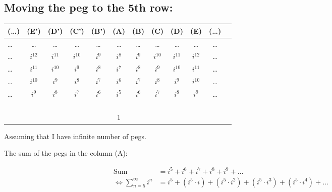 \documentclass[12pt]{article}
\begin{document}
\vspace{1cm}

\subsection*{Moving the peg to the 5th row:}
\begin{center}
    \begin{tabular}{|l|c|c|c|c|c|c|c|c|c|c|r|}
        \hline
        (\dots) & (E') & (D') & (C') & (B') & (A) & (B) & (C) & (D) & (E) & (\dots)\\
        \hline
        \dots & \dots & \dots & \dots & \dots & \dots & \dots & \dots & \dots & \dots & \dots \\
            
        \hline
        \dots & $i^{12}$ & $i^{11}$ & $i^{10}$ & $i^9$ & $i^8$ & $i^9$ & $i^{10}$ & $i^{11}$ & $i^{12}$ & \dots\\
            
        \hline
        \dots & $i^{11}$ & $i^{10}$ & $i^9$ & $i^8$ & $i^7$ & $i^8$ & $i^9$ & $i^{10}$ & $i^{11}$ & \dots\\
            
        \hline
        \dots & $i^{10}$ & $i^9$ & $i^8$ & $i^7$ & $i^6$ & $i^7$ & $i^8$ & $i^9$ & $i^{10}$ & \dots\\
            
        \hline
        \dots & $i^9$ & $i^8$ & $i^7$ & $i^6$ & $i^5$ & $i^6$ & $i^7$ & $i^8$ & $i^9$ & \dots\\
            
        \hline
        & & & & & & & & & &\\
        \hline
        & & & & & & & & & &\\
        \hline
        & & & & & & & & & &\\
        \hline
        & & & & & & & & & &\\
        \hline
        & & & & & $1$ & & & & &\\
        \hline
    \end{tabular}
\end{center}

\noindent Assuming that I have infinite number of pegs.

\noindent The sum of the pegs in the column (A):

\begin{align*}
    \text{Sum} &= i^5+ i^6+ i^7+ i^8+ i^9+ \dots\\
    \Longleftrightarrow
    \sum_{n=5}^{\infty}i^n &= i^5+ \left(i^5\cdot i\right)+ \left(i^5\cdot i^2\right)+ \left(i^5\cdot i^3\right)+ \left(i^5\cdot i^4\right)+ \dots\\
\end{align*}
\end{document}
